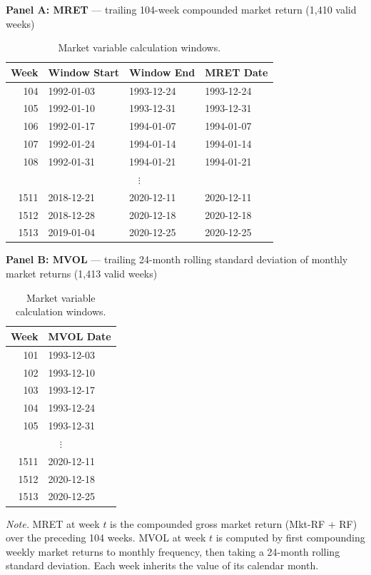 \begin{table}[htbp]
\centering
\caption{Market variable calculation windows.}
\label{tab:mktvar_calc}
\small

\textbf{Panel A: MRET} --- trailing 104-week compounded market return (1,410 valid weeks)\\[4pt]
\begin{tabular}{r l l l}
\toprule
    Week & Window Start & Window End & MRET Date \\
\midrule
    104 & 1992-01-03 & 1993-12-24 & 1993-12-24 \\
    105 & 1992-01-10 & 1993-12-31 & 1993-12-31 \\
    106 & 1992-01-17 & 1994-01-07 & 1994-01-07 \\
    107 & 1992-01-24 & 1994-01-14 & 1994-01-14 \\
    108 & 1992-01-31 & 1994-01-21 & 1994-01-21 \\
    \multicolumn{4}{c}{$\vdots$} \\
    1511 & 2018-12-21 & 2020-12-11 & 2020-12-11 \\
    1512 & 2018-12-28 & 2020-12-18 & 2020-12-18 \\
    1513 & 2019-01-04 & 2020-12-25 & 2020-12-25 \\
\bottomrule
\end{tabular}
\vspace{12pt}

\textbf{Panel B: MVOL} --- trailing 24-month rolling standard deviation of monthly market returns (1,413 valid weeks)\\[4pt]
\begin{tabular}{r l}
\toprule
    Week & MVOL Date \\
\midrule
    101 & 1993-12-03 \\
    102 & 1993-12-10 \\
    103 & 1993-12-17 \\
    104 & 1993-12-24 \\
    105 & 1993-12-31 \\
    \multicolumn{2}{c}{$\vdots$} \\
    1511 & 2020-12-11 \\
    1512 & 2020-12-18 \\
    1513 & 2020-12-25 \\
\bottomrule
\end{tabular}
\vspace{4pt}
\begin{flushleft}
\footnotesize
\textit{Note.} MRET at week $t$ is the compounded gross market return (Mkt-RF + RF) over the preceding 104 weeks. MVOL at week $t$ is computed by first compounding weekly market returns to monthly frequency, then taking a 24-month rolling standard deviation. Each week inherits the value of its calendar month.
\end{flushleft}
\end{table}
